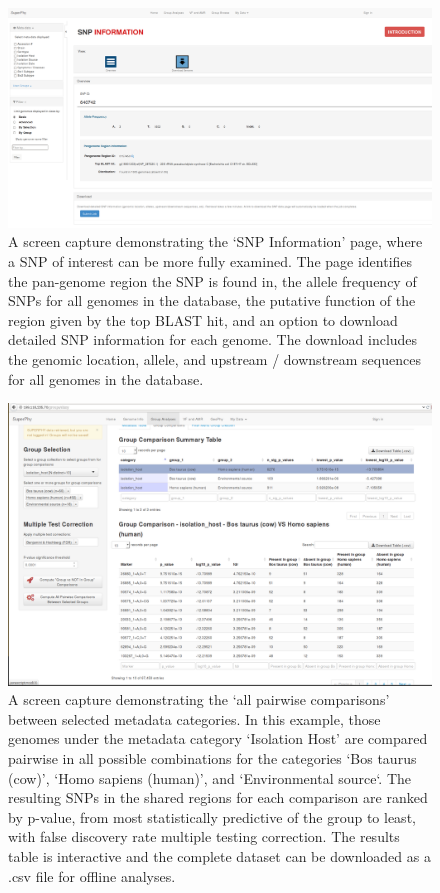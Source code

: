 \documentclass[doublespacing, linenumbers]{bmcart}
\begin{document}
\begin{backmatter}
\begin{landscape}
\newpage
\begin{figure}[h!]
  \includegraphics[width=1\columnwidth]{images/snp_info_page.png}
  \caption{A screen capture demonstrating the `SNP Information' page, where a SNP of interest can be more fully examined. The page identifies the pan-genome region the SNP is found in, the allele frequency of SNPs for all genomes in the database, the putative function of the region given by the top BLAST hit, and an option to download detailed SNP information for each genome. The download includes the genomic location, allele, and upstream / downstream sequences for all genomes in the database. }
  \label{fig:snp_info}
 \end{figure}

\newpage
\begin{figure}[h!]
  \includegraphics[width=0.9\columnwidth]{images/gc_fet_multiple_groups.png}
  \caption{A screen capture demonstrating the `all pairwise comparisons' between selected metadata categories. In this example, those genomes under the metadata category `Isolation Host' are compared pairwise in all possible combinations for the categories `Bos taurus (cow)', `Homo sapiens (human)', and `Environmental source`. The resulting SNPs in the shared regions for each comparison are ranked by p-value, from most statistically predictive of the group to least, with false discovery rate multiple testing correction. The results table is interactive and the complete dataset can be downloaded as a .csv file for offline analyses.}
 \label{fig:fet_multiple_groups}
\end{figure}
\end{landscape}


\end{backmatter}
\end{document}
